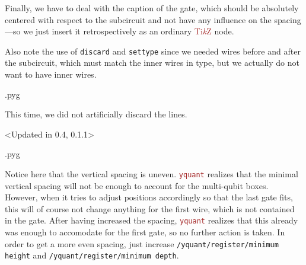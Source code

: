 \documentclass{scrartcl}
\makeatletter
\newenvironment{codeexample}{%
   \VerbatimEnvironment%
   \let\FVB@VerbatimOut\minted@FVB@VerbatimOut
   \let\FVE@VerbatimOut\minted@FVE@VerbatimOut
   \minted@configlang{tex}%
   \minted@fvset
   \begin{VerbatimOut}[codes={\catcode`\^^I=12},firstline,lastline]{\minted@jobname.pyg}%
}{
   \end{VerbatimOut}%
   \minted@langlinenoson%
   \savebox\codeexamplebox{ \minted@jobname.pyg}%
   \ifdim\wd\codeexamplebox>\dimexpr.5\linewidth-3mm\relax%
      \wd\codeexamplebox=.5\linewidth%
   \else%
      \wd\codeexamplebox=\dimexpr\wd\codeexamplebox+3mm\relax%
   \fi%
   \noindent\begin{minipage}{\wd\codeexamplebox}%
      \centering%
      \usebox\codeexamplebox%
   \end{minipage}%
   \begin{minipage}{\dimexpr\linewidth-\wd\codeexamplebox\relax}%
      \expandafter\minted@pygmentize\expandafter{\minted@lang}%
   \end{minipage}%
   \minted@langlinenosoff%
   \par%
}
\def\TikZ{\textcolor{brown}{Ti\textit kZ}}
\def\pkg#1{\textcolor{brown}{\texttt{#1}}}
\def\ttlink{\link\texttt}
\def\Yquant{\pkg{yquant}}
\makeatother
\begin{document}
\begin{example}
               Finally, we have to deal with the caption of the gate, which should be absolutely centered with respect to the subcircuit and not have any influence on the spacing---so we just insert it retrospectively as an ordinary \TikZ{} node.

               Also note the use of \ttlink{discard} and \ttlink{settype} since we needed wires before and after the subcircuit, which must match the inner wires in type, but we actually do not want to have inner wires.
            \end{example}

            \begin{example}
               \begin{codeexample}
               \end{codeexample}
               This time, we did not artificially discard the lines.
            \end{example}

            \begin{example}<Updated in 0.4, 0.1.1>
               \begin{codeexample}
               \end{codeexample}
               Notice here that the vertical spacing is uneven.
               \Yquant{} realizes that the minimal vertical spacing will not be enough to account for the multi\hyp qubit boxes.
               However, when it tries to adjust positions accordingly so that the last gate fits, this will of course not change anything for the first wire, which is not contained in the gate.
               After having increased the spacing, \Yquant{} realizes that this already was enough to accomodate for the first gate, so no further action is taken.
               In order to get a more even spacing, just increase \ttlink{/yquant/register/minimum height} and \ttlink{/yquant/register/minimum depth}.
            \end{example}
\end{document}
